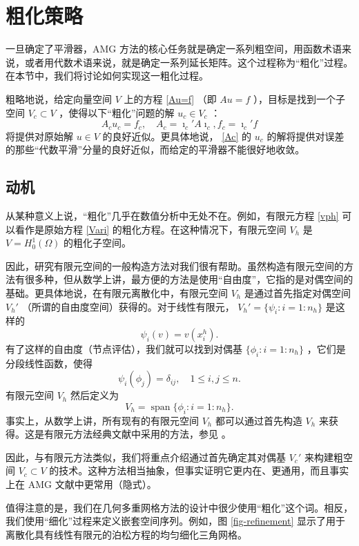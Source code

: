 \documentclass[12pt]{acta_2011xz}
\newcommand{\Span}{\ensuremath{\operatorname{span}}}
\begin{document}
   \section{粗化策略  }       \label{sc:connection}    一旦确定了平滑器，AMG 方法的核心任务就是确定一系列粗空间，用函数术语来说，或者用代数术语来说，就是确定一系列延长矩阵。这个过程称为“粗化”过程。在本节中，我们将讨论如何实现这一粗化过程。  

粗略地说，给定向量空间    $V$    上的方程    \eqref{Au=f}    （即    $Au=f$    ），目标是找到一个子空间    $V_c\subset V$    ，使得以下“粗化”问题的解    $u_c\in V_c$   ：
   \begin{equation}
  \label{Ac}
A_cu_c=f_c, \quad A_c=\imath_c'A\imath_c, f_c=\imath_c'f  
\end{equation}    将提供对原始解    $u\in V$    的良好近似。更具体地说，   \eqref{Ac}    的    $u_c$    的解将提供对误差的那些“代数平滑”分量的良好近似，而给定的平滑器不能很好地收敛。  

   \subsection{动机  }    从某种意义上说，“粗化”几乎在数值分析中无处不在。例如，有限元方程    \eqref{vph}    可以看作是原始方程    \eqref{Vari}    的粗化方程。在这种情况下，有限元空间    $V_h$    是    $V=H_0^1(\Omega)$    的粗化子空间。  

因此，研究有限元空间的一般构造方法对我们很有帮助。虽然构造有限元空间的方法有很多种，但从数学上讲，最方便的方法是使用“自由度”，它指的是对偶空间的基础。更具体地说，在有限元离散化中，有限元空间    $V_h$    是通过首先指定对偶空间    $V_h'$   （所谓的自由度空间）获得的。对于线性有限元，   $V_h'= \{ \psi_i:i=1:n_h \} $    是这样的
   $$
\psi_i(v)=v(x_i^h).
$$    有了这样的自由度（节点评估），我们就可以找到对偶基    $ \{ \phi_i: i=1:n_h \} $   ，它们是分段线性函数，使得
   $$
\psi_i(\phi_j)=\delta_{ij}, \quad 1\le i, j\le n. 
$$    有限元空间    $V_h$    然后定义为 
   $$
V_h=\Span  \{ \phi_i: i=1:n_h \} .
$$    事实上，从数学上讲，所有现有的有限元空间
   $V_h$    都可以通过首先构造    $V_h$    来获得。这是有限元方法经典文献中采用的方法，参见    \cite{2002CiarletP-aa}    。  

因此，与有限元方法类似，我们将重点介绍通过首先确定其对偶基    $V_c'$    来构建粗空间    $V_c\subset V$    的技术。这种方法相当抽象，但事实证明它更内在、更通用，而且事实上在 AMG 文献中更常用（隐式）。  

值得注意的是，我们在几何多重网格方法的设计中很少使用“粗化”这个词。相反，我们使用“细化”过程来定义嵌套空间序列。例如，图    \ref{fig-refinement}    显示了用于离散化具有线性有限元的泊松方程的均匀细化三角网格。  
\end{document}
